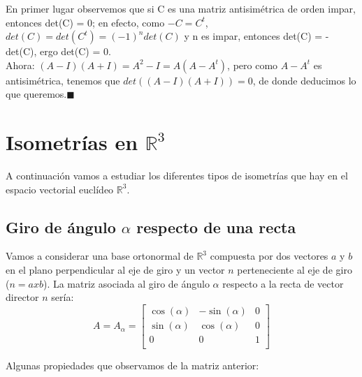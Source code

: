 \documentclass[10pt,a4paper]{article}
\theoremstyle{mystyle}
\begin{document}
En primer lugar observemos que si C es una matriz antisimétrica de orden impar, entonces det(C) = 0; en efecto, como $-C = C^t$, $det(C) = det(C^t) = (-1)^ndet(C)$ y n es impar, entonces det(C) = -det(C), ergo det(C) = 0.\\

Ahora: $(A-I)(A+I) = A^2 - I = A(A - A^t)$, pero como $A-A^t$ es antisimétrica, tenemos que $det((A-I)(A+I)) = 0$, de donde deducimos lo que queremos.$\blacksquare$\\

\section{Isometrías en $\mathbb{R}^3$}

A continuación vamos a estudiar los diferentes tipos de isometrías que hay en el espacio vectorial euclídeo $\mathbb{R}^3$.\\

\subsection{Giro de ángulo $\alpha$ respecto de una recta}

Vamos a considerar una base ortonormal de $\mathbb{R}^3$ compuesta por dos vectores $a$ y $b$ en el plano perpendicular al eje de giro y un vector $n$ perteneciente al eje de giro ($n = axb$). La matriz asociada al giro de ángulo $\alpha$ respecto a la recta de vector director $n$ sería:\\

\[
A=A_{\alpha}=
\begin{bmatrix}
\cos(\alpha) & -\sin(\alpha) & 0 \\
\sin(\alpha) &  \cos(\alpha)  & 0 \\
0 & 0 & 1 \\
\end{bmatrix}
\]


Algunas propiedades que observamos de la matriz anterior:\\ 
\end{document}
